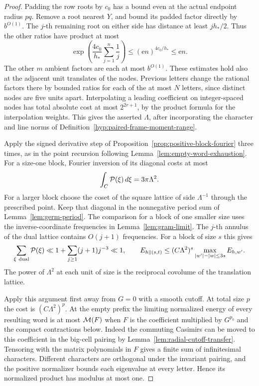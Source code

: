 \begin{proof}
Padding the row roots by \(c_0\) has a bound even at the actual
endpoint radius \(pq\). Remove a root nearest \(Y\), and bound its
padded factor directly by \(b^{O(1)}\). The \(j\)-th remaining
root on either side has distance at least \(jh_*/2\). Thus the
other ratios have product at most
\[
 \exp\!\left(\frac{4c_0}{h_*}\sum_{j=1}^n\frac1j\right)
        \le (\mathrm{e}n)^{4c_0/h_*}\le\mathrm{e}n .
\]
The other \(m\) ambient factors are each at most \(b^{O(1)}\).
These estimates hold also at the adjacent unit translates of the
nodes. Previous letters change the rational factors there by bounded
ratios for each of the at most \(N\) letters, since distinct nodes
are five units apart. Interpolating a leading coefficient on
integer-spaced nodes has total absolute cost at most \(2^{2r+1}\),
by the product formula for the interpolation weights. This gives
the asserted \(\Lambda\), after incorporating the character and line
norms of Definition~\ref{hyp:paired-frame-moment-range}.

Apply the signed derivative step of
Proposition~\ref{prop:positive-block-fourier} three times, as in
the point recursion following Lemma~\ref{lem:empty-word-exhaustion}. For a size-one block, Fourier inversion of its diagonal
costs at most
\[
              \int_{C}{\cal P}(\xi)\,d\xi=3\pi\Lambda^2 .
\]
For a larger block choose the coset of the square lattice of side
\(\Lambda^{-1}\) through the prescribed point. Keep that diagonal
in the nonnegative period sum of Lemma~\ref{lem:germ-period}.
The comparison for a block of one smaller size uses the
inverse-coordinate frequencies in Lemma~\ref{lem:gram-limit}.
The \(j\)-th annulus of the dual lattice contains \(O(j+1)\)
frequencies. For a block of size \(s\) this gives
\[
 \sum_{\xi\ {\rm dual}}{\cal P}(\xi)
       \ll 1+\sum_{j\ge1}(j+1)j^{-3}\ll1,\qquad
 E_{h\|(s,t)}\le(C\Lambda^2)^s\max_{|w'|-|w|\le3s}E_{h,w'} .
\]
The power of \(\Lambda^2\) at each unit of size is the reciprocal
covolume of the translation lattice.

Apply this argument first away from \(G=0\) with a smooth cutoff.
At total size \(p\) the cost is \((C\Lambda^2)^p\). At the empty
prefix the limiting normalized energy of every resulting word is
at most \({\cal M}(F)\) when \(F\) is the coefficient multiplied
by \(G^{p_0}\) and the compact contractions below. Indeed the
commuting Casimirs can be moved to this coefficient in the big-cell
pairing by Lemma~\ref{lem:radial-cutoff-transfer}. Tensoring with the
matrix polynomials in \(F\) gives a finite sum of infinitesimal
characters. Different characters are orthogonal under the invariant
pairing, and the positive normalizer bounds each eigenvalue at
every letter. Hence its normalized product has modulus at most one.


\end{proof}
